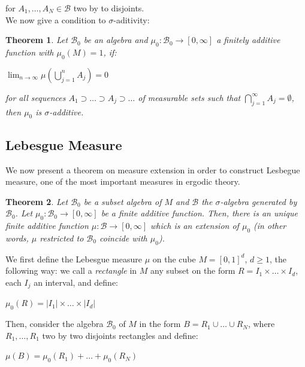 \documentclass[a4paper,12pt] {article}
\newtheorem{theorem}{Theorem}[section]
\begin{document}
\noindent for $A_1,\dots,A_N \in \mathcal{B}$ two by to disjoints.\\

 We now give a condition to $\sigma$-aditivity:\\

\begin{theorem} 
Let $\mathcal{B_0}$ be an algebra and $\mu_0 : \mathcal{B_0} \to [0,\infty]$ a finitely additive function with $\mu_0(M) = 1$, if:
\begin{center}
    $\displaystyle \lim_{n \to \infty} \mu(\displaystyle \bigcup_{j=1}^n A_j) = 0$
\end{center}
 for all sequences $A_1 \supset \dots\supset A_j \supset \dots$ of measurable sets such that $\bigcap_{j=1}^\infty A_j = \emptyset$, then $\mu_0$ is $\sigma$-additive.
\end{theorem}

\subsection{Lebesgue Measure}
 We now present a theorem on measure extension in order to construct Lesbegue measure, one of the most important measures in ergodic theory.

\begin{theorem}
Let $\mathcal{B}_0$ be a subset algebra of $M$ and $\mathcal{B}$ the $\sigma$-algebra generated by $\mathcal{B}_0$. Let 
$\mu_0 : \mathcal{B}_0 \to [0,\infty]$ be a finite additive function. Then, there is an unique finite additive function $\mu : \mathcal{B} \to [0,\infty]$ which is an extension of $\mu_0$ (in other words, $\mu$ restricted to $\mathcal{B}_0$ coincide with $\mu_0$).
\end{theorem}
 
 We first define the Lebesgue measure $\mu$ on the cube $M = [0,1]^d$, $d\geq1$, the following way: we call a \textit{rectangle} in $M$ any subset on the form $R = I_1\times\dots\times I_d$, each $I_j$ an interval, and define:\\

\begin{center}
    $\mu_0(R) = |I_1|\times\dots\times |I_d|$
\end{center}

 Then, consider the algebra $\mathcal{B}_0$ of $M$ in the form $B = R_1\cup\dots\cup R_N$, where $R_1,\dots,R_1$ two by two disjoints rectangles and define:
\begin{center}
    $\mu(B) = \mu_0(R_1) + \dots + \mu_0(R_N)$
\end{center}
\end{document}
